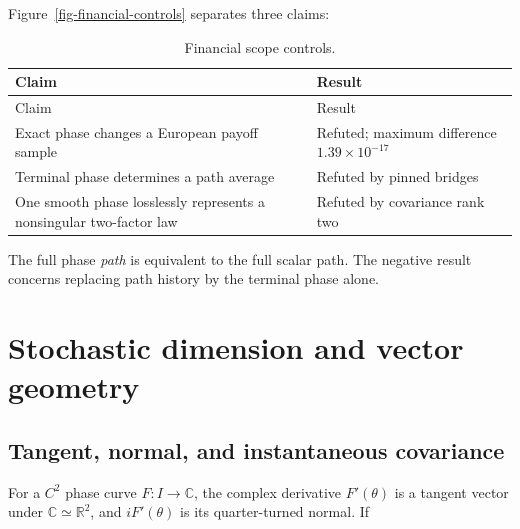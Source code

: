 \documentclass[
  english,
  10pt,
  letterpaper,
  DIV=11,
  numbers=noendperiod]{scrartcl}
\theoremstyle{definition}
\theoremstyle{plain}
\theoremstyle{plain}
\theoremstyle{remark}
\begin{document}
Figure~\ref{fig-financial-controls} separates three claims:

\begin{longtable}[]{@{}
  >{\raggedright\arraybackslash}p{}
  >{\raggedright\arraybackslash}p{}@{}}
\caption{Financial scope
controls.}\label{tbl-financial-controls}\tabularnewline
\toprule\noalign{}
\begin{minipage}[b]{\linewidth}\raggedright
Claim
\end{minipage} & \begin{minipage}[b]{\linewidth}\raggedright
Result
\end{minipage} \\
\midrule\noalign{}
\endfirsthead
\toprule\noalign{}
\begin{minipage}[b]{\linewidth}\raggedright
Claim
\end{minipage} & \begin{minipage}[b]{\linewidth}\raggedright
Result
\end{minipage} \\
\midrule\noalign{}
\endhead
\bottomrule\noalign{}
\endlastfoot
Exact phase changes a European payoff sample & Refuted; maximum
difference \(1.39\times10^{-17}\) \\
Terminal phase determines a path average & Refuted by pinned bridges \\
One smooth phase losslessly represents a nonsingular two-factor law &
Refuted by covariance rank two \\
\end{longtable}

The full phase \emph{path} is equivalent to the full scalar path. The
negative result concerns replacing path history by the terminal phase
alone.

\section{Stochastic dimension and vector geometry}\label{sec-vector}

\subsection{Tangent, normal, and instantaneous
covariance}\label{tangent-normal-and-instantaneous-covariance}

For a \(C^2\) phase curve \(F:I\to\mathbb C\), the complex derivative
\(F'(\theta)\) is a tangent vector under \(\mathbb C\simeq\mathbb R^2\),
and \(iF'(\theta)\) is its quarter-turned normal. If
\end{document}
